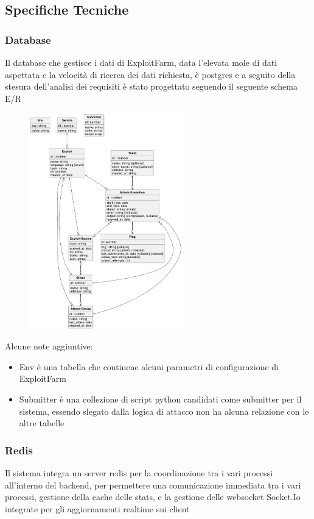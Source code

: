 \documentclass[11pt]{article}
\begin{document}
\subsection{Specifiche Tecniche}
\subsubsection{Database}
Il database che gestisce i dati di ExploitFarm, data l'elevata mole di dati aspettata e la velocità di ricerca dei dati richiesta, è postgres e a seguito della stesura dell'analisi dei requisiti è stato progettato seguendo il seguente schema E/R
    \begin{figure}[H]
    	\centering
    	\includegraphics[width=0.6\textwidth]{ExploitFarmDB.png}
	\end{figure}
	Alcune note aggiuntive:
	\begin{itemize}
		\item Env è una tabella che continene alcuni parametri di configurazione di ExploitFarm
		\item Submitter è una collezione di script python candidati come submitter per il sistema, essendo slegato dalla logica di attacco non ha alcuna relazione con le altre tabelle
	\end{itemize}
\subsubsection{Redis}
Il sistema integra un server redis per la coordinazione tra i vari processi all'interno del backend, per permettere una comunicazione immediata tra i vari processi, gestione della cache delle stats, e la gestione delle websocket Socket.Io integrate per gli aggiornamenti realtime sui client
\end{document}
